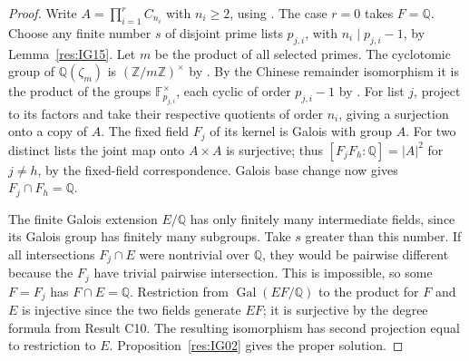 \begin{proof}
Write \(A=\prod_{i=1}^r C_{n_i}\) with \(n_i\geq2\),
using \cite[Result K07.07.invariant\_factor\_existence]{mg-d07}.
The case \(r=0\) takes \(F=\mathbb Q\). Choose any finite
number \(s\) of disjoint prime lists \(p_{j,i}\), with
\(n_i\mid p_{j,i}-1\), by Lemma~\ref{res:IG15}.
Let \(m\) be the product of all selected primes. The cyclotomic
group of \(\mathbb Q(\zeta_m)\) is
\((\mathbb Z/m\mathbb Z)^\times\) by
\cite[Result K07.15.cyclotomic\_galois]{mg-d07}.
By the Chinese remainder isomorphism it is the product of
the groups \(\mathbb F_{p_{j,i}}^\times\), each cyclic of
order \(p_{j,i}-1\) by
\cite[Result K07.13.multiplicative\_cyclic]{mg-d07}.
For list \(j\), project to its factors and take their respective
quotients of order \(n_i\), giving a surjection onto a copy
of \(A\). The fixed field \(F_j\) of its kernel is Galois
with group \(A\). For two distinct lists the joint map onto
\(A\times A\) is surjective; thus
\([F_jF_h:\mathbb Q]=|A|^2\) for \(j\ne h\), by the
fixed-field correspondence. Galois base change
\cite[Result C10]{mg-aft} now gives \(F_j\cap F_h=\mathbb Q\).

The finite Galois extension \(E/\mathbb Q\) has only finitely
many intermediate fields, since its Galois group has finitely
many subgroups. Take \(s\) greater than this number. If all
intersections \(F_j\cap E\) were nontrivial over \(\mathbb Q\),
they would be pairwise different because the \(F_j\) have
trivial pairwise intersection. This is impossible, so some
\(F=F_j\) has \(F\cap E=\mathbb Q\). Restriction from
\(\operatorname{Gal}(EF/\mathbb Q)\) to the product for \(F\)
and \(E\) is injective since the two fields generate \(EF\);
it is surjective by the degree formula from Result C10.
The resulting isomorphism has second projection equal to
restriction to \(E\). Proposition~\ref{res:IG02} gives the
proper solution.
\end{proof}

